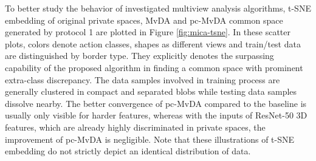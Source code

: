     To better study the behavior of investigated multiview analysis algorithms, t-SNE embedding of original private spaces, MvDA and pc-MvDA common space generated by protocol 1 are plotted in Figure \ref{fig:mica-tsne}. In these scatter plots, colors denote action classes, shapes as different views and train/test data are distinguished by border type. They explicitly denotes the surpassing capability of the proposed algorithm in finding a common space with prominent extra-class discrepancy. The data samples involved in training process are generally clustered in compact and separated blobs while testing data samples dissolve nearby. The better convergence of pc-MvDA compared to the baseline is usually only visible for harder features, whereas with the inputs of ResNet-50 3D features, which are already highly discriminated in private spaces, the improvement of pc-MvDA is negligible. Note that these illustrations of t-SNE embedding do not strictly depict an identical distribution of data.

